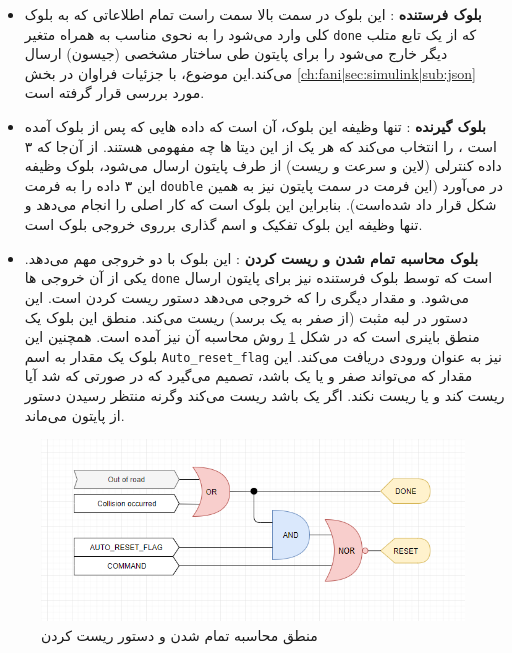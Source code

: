 \begin{itemize}
	\item \textbf{بلوک فرستنده} :
	این بلوک در سمت بالا سمت راست تمام اطلاعاتی که به بلوک کلی 
	وارد می‌شود را به نحوی مناسب به همراه متغیر \texttt{done} که از یک تابع متلب دیگر خارج می‌شود را برای پایتون طی ساختار مشخصی (جیسون) ارسال می‌کند.این موضوع، با جزئیات فراوان در بخش
	\ref{ch:fani|sec:simulink|sub:json}
	مورد بررسی قرار گرفته است.
	\item \textbf{بلوک گیرنده} :
	تنها وظیفه این بلوک، آن است که داده هایی که پس از بلوک  آمده است ، را انتخاب می‌کند که هر یک از این دیتا ها چه مفهومی هستند. از آن‌جا که ۳ داده کنترلی (لاین و سرعت و ریست) از طرف پایتون ارسال می‌شود، بلوک  وظیفه این ۳ داده را به فرمت \texttt{double} در می‌آورد (این فرمت در سمت پایتون نیز به همین شکل قرار داد شده‌است). بنابراین این بلوک  است که کار اصلی را انجام می‌دهد و تنها وظیفه این بلوک تفکیک و اسم گذاری بر‌روی خروجی بلوک  است.
	
	\item \textbf{بلوک محاسبه تمام شدن و ریست کردن} :
	این بلوک با دو خروجی مهم می‌دهد. یکی از آن خروجی ها \texttt{done} است که توسط بلوک فرستنده نیز برای پایتون ارسال می‌شود. و مقدار دیگری را که خروجی می‌دهد دستور ریست کردن است. این دستور در لبه مثبت (از صفر به یک برسد) ریست می‌کند. منطق این بلوک یک منطق باینری است که در شکل 
	\ref{fig:done-reset-logical}
	روش محاسبه آن نیز آمده است. 
	همچنین این بلوک یک مقدار به اسم \texttt{Auto\_reset\_flag} نیز به عنوان ورودی دریافت می‌کند. این مقدار که می‌تواند صفر و یا یک باشد، تصمیم می‌گیرد که در صورتی که  شد آیا ریست کند و یا ریست نکند. اگر یک باشد ریست می‌کند وگرنه منتظر رسیدن دستور از پایتون می‌ماند.
	
\end{itemize}

\begin{figure}
	\centering
	\includegraphics[width=0.7\linewidth]{Figures/done-reset-logical}
	\caption{منطق محاسبه تمام شدن و دستور ریست کردن}
	\label{fig:done-reset-logical}
\end{figure}


